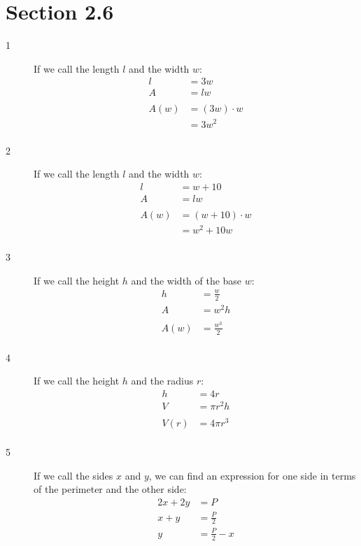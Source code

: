 \documentclass{exam}
\begin{document}
  \pagebreak

  \section{Section 2.6}
  \begin{description}
    \item[1]
      If we call the length $l$ and the width $w$:
      \begin{align*}
        l    &= 3w \\
        A    &= lw \\
        \\
        A(w) &= (3w) \cdot w \\
             &= 3w^2 \\
      \end{align*}

    \item[2]
      If we call the length $l$ and the width $w$:
      \begin{align*}
        l    &= w + 10 \\
        A    &= lw \\
        \\
        A(w) &= (w + 10) \cdot w \\
             &= w^2 + 10w \\
      \end{align*}

    \item[3]
      If we call the height $h$ and the width of the base $w$:
      \begin{align*}
        h    &= \frac{w}{2} \\
        A    &= w^2h \\
        \\
        A(w) &= \frac{w^3}{2} \\
      \end{align*}

    \item[4]
      If we call the height $h$ and the radius $r$:
      \begin{align*}
        h    &= 4r \\
        V    &= \pi r^2 h \\
        \\
        V(r) &= 4 \pi r^3 \\
      \end{align*}

    \item[5] 
      If we call the sides $x$ and $y$, we can find an expression for one side in terms of the perimeter and the other
      side:
      \begin{align*}
        2x + 2y &= P \\
        x + y   &= \frac{P}{2} \\
        y       &= \frac{P}{2} - x \\
      \end{align*}


\end{description}
\end{document}
